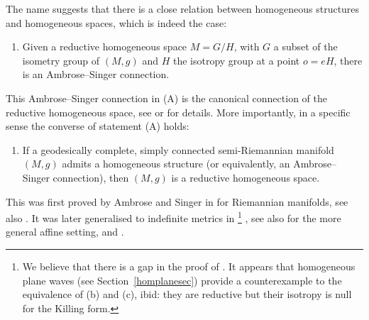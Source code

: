 \documentclass[11pt,a4paper]{amsart}
\def\blu{\color[rgb]{0,0,1}}
\newcommand{\tnab}{\widetilde{\nabla}}
\newcommand{\tR}{\widetilde{R}}
\newcommand{\g}{\mathfrak{g}}
\newcommand{\h}{\mathfrak{h}}
\newcommand{\m}{\mathfrak{m}}
\newcommand{\+}{\oplus}
\newcommand{\1}{\mathbf{1}}
\newcommand{\Tcom}[1]{\marginpar{\scriptsize \blu\tt #1}}
\newcommand{\<}{\langle}
\renewcommand{\>}{\rangle}
\theoremstyle{definition}
\theoremstyle{plain}
\numberwithin{equation}{section}
\begin{document}
The name suggests that there is a close relation between homogeneous structures and homogeneous spaces, which is indeed the case:
\begin{enumerate}
\item[(A)]
Given a  reductive homogeneous space $M=G/H$, with $G$ a subset of the isometry group of $(M,g)$ and $H$ the isotropy group at a point $o=eH$, there is an Ambrose--Singer connection.
\end{enumerate}
This Ambrose--Singer connection in (A) is the canonical connection of the reductive homogeneous space, see \cite{AmbroseSinger58} or \cite[Section II.11]{ko-no1} for 
details.
%
More importantly, in a specific sense the converse of  statement (A) holds:
 \begin{enumerate}
\item[(B)]
 If a geodesically complete, simply connected semi-Riemannian manifold $(M,g)$ admits a homogeneous structure (or equivalently, an Ambrose--Singer connection), then $(M,g)$ is a reductive homogeneous space.
 \end{enumerate}
  This was first proved by Ambrose and Singer in \cite[Section 3]{AmbroseSinger58} for Riemannian manifolds, see also \cite{tricerri-vanhecke83}. It was later generalised to indefinite metrics in \cite{GadeaOubina92}\footnote{We believe that there is a gap in the proof of \cite[Theorem 1]{GadeaOubina92}. It appears that homogeneous plane waves (see Section~\ref{homplanesec}) provide a counterexample to the equivalence of (b) and (c), ibid: they are reductive but their isotropy is null for the Killing form.
  }
  , see also \cite[Theorem I.40]{Kowalski80} for the more general affine setting, and \cite[Theorem 2.2.1]{CalvarusoCastrillon-Lopez19}.
  
\end{document}
